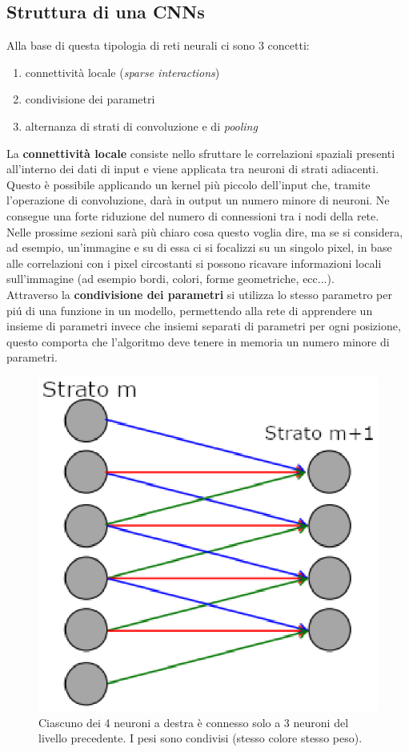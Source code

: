 \documentclass[a4paper,12pt]{report}
\begin{document}
\subsection{Struttura di una CNNs}
Alla base di questa tipologia di reti neurali ci sono 3 concetti:
\begin{enumerate}
\item connettivit\`{a} locale (\textit{sparse interactions})
\item condivisione dei parametri
\item alternanza di strati di convoluzione e di \textit{pooling}
\end{enumerate}
La \textbf{connettivit\`{a} locale} consiste nello sfruttare le correlazioni spaziali presenti all'interno dei dati di input e viene applicata tra neuroni di strati adiacenti. Questo \`e possibile applicando un kernel pi\`{u} piccolo dell'input che, tramite l'operazione di convoluzione, dar\`{a} in output un numero minore di neuroni. Ne consegue una forte riduzione del numero di connessioni tra i nodi della rete.\\
Nelle prossime sezioni sar\`{a} pi\`{u} chiaro cosa questo voglia dire, ma se si considera, ad esempio, un'immagine e su di essa ci si focalizzi su un singolo pixel, in base alle correlazioni con i pixel circostanti si possono ricavare informazioni locali sull'immagine (ad esempio bordi, colori, forme geometriche, ecc...).\\
Attraverso la \textbf{condivisione dei parametri} si utilizza lo stesso parametro per pi\'{u} di una funzione in un modello, permettendo alla rete di apprendere un insieme di parametri invece che insiemi separati di parametri per ogni posizione, questo comporta che l'algoritmo deve tenere in memoria un numero minore di parametri.\\
\begin{figure}[!h]
\centering
\includegraphics{CNN}
\caption{Ciascuno dei 4 neuroni a destra \`{e} connesso solo a 3 neuroni del livello precedente. I pesi sono condivisi (stesso colore stesso peso).}
\end{figure}
\end{document}
